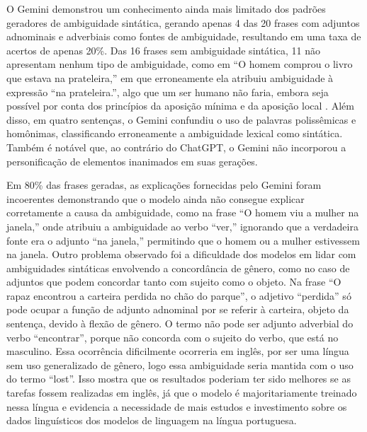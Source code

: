 O Gemini demonstrou um conhecimento ainda mais limitado dos padrões geradores de ambiguidade sintática, gerando apenas 4 das 20 frases com adjuntos adnominais e adverbiais como fontes de ambiguidade, resultando em uma taxa de acertos de apenas 20\%. Das 16 frases sem ambiguidade sintática, 11 não apresentam nenhum tipo de ambiguidade, como em \enquote{O homem comprou o livro que estava na prateleira,} em que erroneamente ela atribuiu ambiguidade à expressão \enquote{na prateleira.}, algo que um ser humano não faria, embora seja possível por conta dos princípios da aposição mínima e da aposição local \cite{brito2013processamento, maiadimensoes}. Além disso, em quatro sentenças, o Gemini confundiu o uso de palavras polissêmicas e homônimas, classificando erroneamente a ambiguidade lexical como sintática. Também é notável que, ao contrário do ChatGPT, o Gemini não incorporou a personificação de elementos inanimados em suas gerações.

Em 80\% das frases geradas, as explicações fornecidas pelo Gemini foram incoerentes demonstrando que o modelo ainda não consegue explicar corretamente a causa da ambiguidade, como na frase \enquote{O homem viu a mulher na janela,} onde atribuiu a ambiguidade ao verbo \enquote{ver,} ignorando que a verdadeira fonte era o adjunto \enquote{na janela,} permitindo que o homem ou a mulher estivessem na janela. Outro problema observado foi a dificuldade dos modelos em lidar com ambiguidades sintáticas envolvendo a concordância de gênero, como no caso de adjuntos que podem concordar tanto com sujeito como o objeto. Na frase \enquote{O rapaz encontrou a carteira perdida no chão do parque}, o adjetivo \enquote{perdida} só pode ocupar a função de adjunto adnominal por se referir à carteira, objeto da sentença, devido à flexão de gênero. O termo não pode ser adjunto adverbial do verbo \enquote{encontrar}, porque não concorda com o sujeito do verbo, que está no masculino. Essa ocorrência dificilmente ocorreria em inglês, por ser uma língua sem uso generalizado de gênero, logo essa ambiguidade seria mantida com o uso do termo \enquote{lost}. Isso mostra que os resultados poderiam ter sido melhores se as tarefas fossem realizadas em inglês, já que o modelo é majoritariamente treinado nessa língua e evidencia a necessidade de mais estudos e investimento sobre os dados linguísticos dos modelos de linguagem na língua portuguesa.


